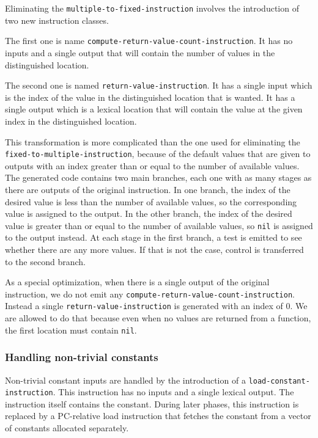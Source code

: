 Eliminating the \texttt{multiple-to-fixed-instruction} involves the
introduction of two new instruction classes.

The first one is name
\texttt{compute-return-value-count-instruction}.  It has no inputs and
a single output that will contain the number of values in the
distinguished location.

The second one is named \texttt{return-value-instruction}.  It has a
single input which is the index of the value in the distinguished
location that is wanted.  It has a single output which is a lexical
location that will contain the value at the given index in the
distinguished location.

This transformation is more complicated than the one used for
eliminating the \texttt{fixed-to-multiple-instruction}, because of the
default values that are given to outputs with an index greater than or
equal to the number of available values.  The generated code contains
two main branches, each one with as many stages as there are outputs
of the original instruction.  In one branch, the index of the desired
value is less than the number of available values, so the
corresponding value is assigned to the output.  In the other branch,
the index of the desired value is greater than or equal to the number
of available values, so \texttt{nil} is assigned to the output
instead.  At each stage in the first branch, a test is emitted to see
whether there are any more values.  If that is not the case, control
is transferred to the second branch.

As a special optimization, when there is a single output of the
original instruction, we do not emit any
\texttt{compute-return-value-count-instruction}.  Instead a single
\texttt{return-value-instruction} is generated with an index of $0$.
We are allowed to do that because even when no values are returned
from a function, the first location must contain \texttt{nil}.

\subsubsection{Handling non-trivial constants}

Non-trivial constant inputs are handled by the introduction of a
\texttt{load-constant-instruction}.  This instruction has no inputs
and a single lexical output.  The instruction itself contains the
constant.  During later phases, this instruction is replaced by a
PC-relative load instruction that fetches the constant from a vector
of constants allocated separately.

